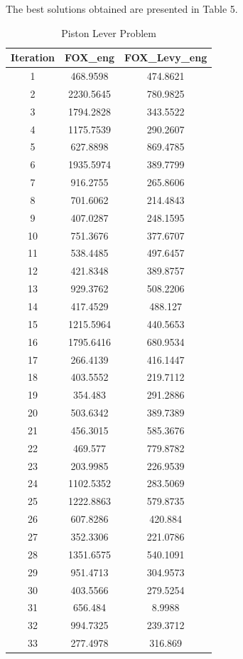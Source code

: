 \documentclass[
]{article}
\begin{document}
\begin{justify}
{The best solutions obtained are presented in Table 5.
\begin{table}[htbp]
\centering
\caption{Piston Lever Problem}
\label{tab:fox_values}
\begin{tabular}{ccc}
\toprule
Iteration & FOX\_eng & FOX\_Levy\_eng \\
\midrule
1  &  468.9598 & 474.8621 \\
2  &  2230.5645 & 780.9825 \\
3  &  1794.2828 & 343.5522 \\
4  &  1175.7539 & 290.2607 \\
5  &  627.8898 & 869.4785 \\
6  &  1935.5974 & 389.7799 \\
7  &  916.2755 & 265.8606 \\
8  &  701.6062 & 214.4843 \\
9  &  407.0287 & 248.1595 \\
10 &  751.3676 & 377.6707 \\
11 &  538.4485 & 497.6457 \\
12 &  421.8348 & 389.8757 \\
13 &  929.3762 & 508.2206 \\
14 &  417.4529 & 488.127 \\
15 &  1215.5964 & 440.5653 \\
16 &  1795.6416 & 680.9534 \\
17 &  266.4139 & 416.1447 \\
18 &  403.5552 & 219.7112 \\
19 &  354.483 & 291.2886 \\
20 &  503.6342 & 389.7389 \\
21 &  456.3015 & 585.3676 \\
22 &  469.577 & 779.8782 \\
23 &  203.9985 & 226.9539 \\
24 &  1102.5352 & 283.5069 \\
25 &  1222.8863 & 579.8735 \\
26 &  607.8286 & 420.884 \\
27 &  352.3306 & 221.0786 \\
28 &  1351.6575 & 540.1091 \\
29 &  951.4713 & 304.9573 \\
30 &  403.5566 & 279.5254 \\
31 &  656.484 & 8.9988 \\
32 &  994.7325 & 239.3712 \\
33 &  277.4978 & 316.869 \\

\end{tabular}
\end{table}}
\end{justify}
\end{document}
